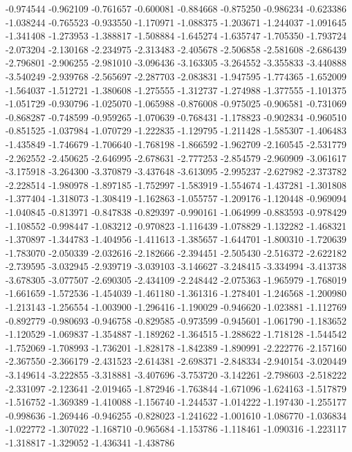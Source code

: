 -0.974544
-0.962109
-0.761657
-0.600081
-0.884668
-0.875250
-0.986234
-0.623386
-1.038244
-0.765523
-0.933550
-1.170971
-1.088375
-1.203671
-1.244037
-1.091645
-1.341408
-1.273953
-1.388817
-1.508884
-1.645274
-1.635747
-1.705350
-1.793724
-2.073204
-2.130168
-2.234975
-2.313483
-2.405678
-2.506858
-2.581608
-2.686439
-2.796801
-2.906255
-2.981010
-3.096436
-3.163305
-3.264552
-3.355833
-3.440888
-3.540249
-2.939768
-2.565697
-2.287703
-2.083831
-1.947595
-1.774365
-1.652009
-1.564037
-1.512721
-1.380608
-1.275555
-1.312737
-1.274988
-1.377555
-1.101375
-1.051729
-0.930796
-1.025070
-1.065988
-0.876008
-0.975025
-0.906581
-0.731069
-0.868287
-0.748599
-0.959265
-1.070639
-0.768431
-1.178823
-0.902834
-0.960510
-0.851525
-1.037984
-1.070729
-1.222835
-1.129795
-1.211428
-1.585307
-1.406483
-1.435849
-1.746679
-1.706640
-1.768198
-1.866592
-1.962709
-2.160545
-2.531779
-2.262552
-2.450625
-2.646995
-2.678631
-2.777253
-2.854579
-2.960909
-3.061617
-3.175918
-3.264300
-3.370879
-3.437648
-3.613095
-2.995237
-2.627982
-2.373782
-2.228514
-1.980978
-1.897185
-1.752997
-1.583919
-1.554674
-1.437281
-1.301808
-1.377404
-1.318073
-1.308419
-1.162863
-1.055757
-1.209176
-1.120448
-0.969094
-1.040845
-0.813971
-0.847838
-0.829397
-0.990161
-1.064999
-0.883593
-0.978429
-1.108552
-0.998447
-1.083212
-0.970823
-1.116439
-1.078829
-1.132282
-1.468321
-1.370897
-1.344783
-1.404956
-1.411613
-1.385657
-1.644701
-1.800310
-1.720639
-1.783070
-2.050339
-2.032616
-2.182666
-2.394451
-2.505430
-2.516372
-2.622182
-2.739595
-3.032945
-2.939719
-3.039103
-3.146627
-3.248415
-3.334994
-3.413738
-3.678305
-3.077507
-2.690305
-2.434109
-2.248442
-2.075363
-1.965979
-1.768019
-1.661659
-1.572536
-1.454039
-1.461180
-1.361316
-1.278401
-1.246568
-1.200980
-1.213143
-1.256554
-1.003900
-1.296416
-1.190029
-0.946620
-1.023881
-1.112769
-0.892779
-0.980693
-0.946758
-0.829585
-0.973599
-0.945601
-1.061790
-1.183652
-1.120529
-1.069837
-1.354887
-1.189262
-1.364515
-1.288622
-1.718128
-1.544542
-1.752069
-1.708993
-1.736201
-1.828178
-1.842389
-1.890991
-2.222776
-2.157160
-2.367550
-2.366179
-2.431523
-2.614381
-2.698371
-2.848334
-2.940154
-3.020449
-3.149614
-3.222855
-3.318881
-3.407696
-3.753720
-3.142261
-2.798603
-2.518222
-2.331097
-2.123641
-2.019465
-1.872946
-1.763844
-1.671096
-1.624163
-1.517879
-1.516752
-1.369389
-1.410088
-1.156740
-1.244537
-1.014222
-1.197430
-1.255177
-0.998636
-1.269446
-0.946255
-0.828023
-1.241622
-1.001610
-1.086770
-1.036834
-1.022772
-1.307022
-1.168710
-0.965684
-1.153786
-1.118461
-1.090316
-1.223117
-1.318817
-1.329052
-1.436341
-1.438786

